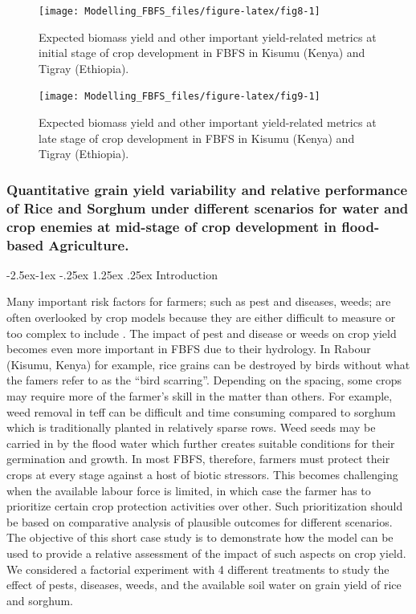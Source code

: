 \documentclass[12pt,oneside]{article}
\makeatletter
\renewcommand\paragraph{\@startsection{paragraph}{4}{\z@}%
            {-2.5ex\@plus -1ex \@minus -.25ex}%
            {1.25ex \@plus .25ex}%
            {\normalfont\normalsize\bfseries}}
\makeatother
\begin{document}
\begin{figure}[!htbp]

{\centering \texttt{[image: Modelling\_FBFS\_files/figure-latex/fig8-1]} 

}

\caption{Expected biomass yield and other important yield-related metrics at initial stage of crop development in FBFS in Kisumu (Kenya) and Tigray (Ethiopia).}\label{fig:fig8}
\end{figure}

\begin{figure}[!htbp]

{\centering \texttt{[image: Modelling\_FBFS\_files/figure-latex/fig9-1]} 

}

\caption{Expected biomass yield and other important yield-related metrics at late stage of crop development in FBFS in Kisumu (Kenya) and Tigray (Ethiopia).}\label{fig:fig9}
\end{figure}

\hypertarget{IV23}{%
\subsubsection{Quantitative grain yield variability and relative performance of Rice and Sorghum under different scenarios for water and crop enemies at mid-stage of crop development in flood-based Agriculture.}\label{IV23}}

\hypertarget{IV231}{%
\paragraph{Introduction}\label{IV231}}

Many important risk factors for farmers; such as pest and diseases, weeds; are often overlooked by crop models because they are either difficult to measure or too complex to include . The impact of pest and disease or weeds on crop yield becomes even more important in FBFS due to their hydrology. In Rabour (Kisumu, Kenya) for example, rice grains can be destroyed by birds without what the famers refer to as the ``bird scarring''. Depending on the spacing, some crops may require more of the farmer's skill in the matter than others. For example, weed removal in teff can be difficult and time consuming compared to sorghum which is traditionally planted in relatively sparse rows. Weed seeds may be carried in by the flood water which further creates suitable conditions for their germination and growth. In most FBFS, therefore, farmers must protect their crops at every stage against a host of biotic stressors. This becomes challenging when the available labour force is limited, in which case the farmer has to prioritize certain crop protection activities over other. Such prioritization should be based on comparative analysis of plausible outcomes for different scenarios. The objective of this short case study is to demonstrate how the model can be used to provide a relative assessment of the impact of such aspects on crop yield. We considered a factorial experiment with 4 different treatments to study the effect of pests, diseases, weeds, and the available soil water on grain yield of rice and sorghum.
\end{document}
